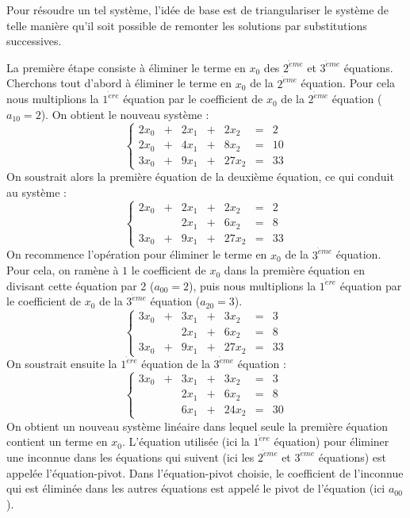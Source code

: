 Pour résoudre un tel système, l'idée de base est de triangulariser 
le système de telle manière qu'il soit possible de remonter les
solutions par substitutions successives.

La première étape consiste à éliminer le terme en $x_0$ des 
$2^{\grave eme}$ et $3^{\grave eme}$ équations.
Cherchons tout d'abord à éliminer le terme en $x_0$ de la $2^{\grave eme}$
équation. Pour cela nous multiplions la $1^{\grave ere}$ équation par le 
coefficient de $x_0$ de la $2^{\grave eme}$ équation ($a_{10} = 2$). 
On obtient le nouveau système :
$$\left\{
\begin{array}{rcrcrcr}
2x_0 & + & 2x_1 & + &  2x_2 & = &  2 \\
2x_0 & + & 4x_1 & + &  8x_2 & = & 10 \\
3x_0 & + & 9x_1 & + & 27x_2 & = & 33
\end{array}
\right.$$
On soustrait alors la première équation de la deuxième équation, 
ce qui conduit au système :
$$\left\{
\begin{array}{rcrcrcr}
2x_0 & + & 2x_1 & + &  2x_2 & = &  2 \\
     &   & 2x_1 & + &  6x_2 & = &  8 \\
3x_0 & + & 9x_1 & + & 27x_2 & = & 33
\end{array}
\right.$$
On recommence l'opération pour éliminer le terme en $x_0$ de la $3^{\grave eme}$
équation. Pour cela, on ramène à $1$ le coefficient de $x_0$ dans
la première équation en divisant cette équation par 2 ($a_{00} = 2$),
puis nous multiplions la $1^{\grave ere}$ équation par le 
coefficient de $x_0$ de la $3^{\grave eme}$ équation ($a_{20} = 3$). 
$$\left\{
\begin{array}{rcrcrcr}
3x_0 & + & 3x_1 & + &  3x_2 & = &  3 \\
     &   & 2x_1 & + &  6x_2 & = &  8 \\
3x_0 & + & 9x_1 & + & 27x_2 & = & 33
\end{array}
\right.$$
On soustrait ensuite la $1^{\grave ere}$ équation de la $3^{\grave eme}$ équation :
$$\left\{
\begin{array}{rcrcrcr}
3x_0 & + & 3x_1 & + &  3x_2 & = &  3 \\
     &   & 2x_1 & + &  6x_2 & = &  8 \\
     &   & 6x_1 & + & 24x_2 & = & 30
\end{array}
\right.$$
On obtient un nouveau système linéaire dans lequel seule la première équation contient
un terme en $x_0$.
L'équation utilisée (ici la $1^{\grave ere}$ équation) pour éliminer une inconnue 
dans les équations qui suivent (ici les $2^{\grave eme}$ et $3^{\grave eme}$ équations)
est appelée l'équation-pivot. Dans l'équation-pivot choisie, le coefficient de 
l'inconnue qui est éliminée dans les autres équations est appelé le pivot de
l'équation (ici $a_{00}$).

